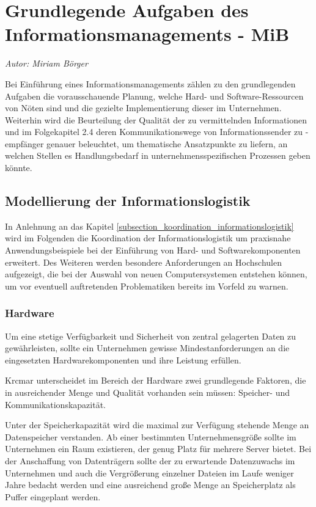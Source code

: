 \section{Grundlegende Aufgaben des Informationsmanagements - MiB}
\label{grundlegende_aufgaben_des_informationsmanagements}
\textit{Autor: Miriam Börger}

Bei Einführung eines Informationsmanagements zählen zu den grundlegenden Aufgaben die 
vorausschauende Planung, welche Hard- und Software-Ressourcen von Nöten sind und die 
gezielte Implementierung dieser im Unternehmen. Weiterhin wird die Beurteilung der Qualität 
der zu vermittelnden Informationen und im Folgekapitel 2.4 deren Kommunikationswege von 
Informationssender zu -empfänger genauer beleuchtet, um thematische Ansatzpunkte zu 
liefern, an welchen Stellen es Handlungsbedarf in unternehmensspezifischen Prozessen 
geben könnte. 

\subsection{Modellierung der Informationslogistik}
In Anlehnung an das Kapitel \ref{subsection_koordination_informationslogistik} wird im Folgenden die Koordination der 
Informationslogistik um praxisnahe Anwendungsbeispiele bei der Einführung von Hard- und 
Softwarekomponenten erweitert. Des Weiteren werden besondere Anforderungen an 
Hochschulen aufgezeigt, die bei der Auswahl von neuen Computersystemen entstehen können, 
um vor eventuell auftretenden Problematiken bereits im Vorfeld zu warnen.

\subsubsection{Hardware}
Um eine stetige Verfügbarkeit und Sicherheit von zentral gelagerten Daten zu gewährleisten, 
sollte ein Unternehmen gewisse Mindestanforderungen an die eingesetzten Hardwarekomponenten 
und ihre Leistung erfüllen. 

Krcmar unterscheidet im Bereich der Hardware zwei grundlegende Faktoren, die in ausreichender 
Menge und Qualität vorhanden sein müssen: Speicher- und Kommunikationskapazität. 

Unter der Speicherkapazität wird die maximal zur Verfügung stehende Menge an Datenspeicher verstanden. 
Ab einer bestimmten Unternehmensgröße sollte im Unternehmen ein Raum existieren, der genug Platz 
für mehrere Server bietet. Bei der Anschaffung von Datenträgern sollte der zu erwartende 
Datenzuwachs im Unternehmen und auch die Vergrößerung einzelner Dateien im Laufe weniger Jahre 
bedacht werden und eine ausreichend große Menge an Speicherplatz als Puffer eingeplant werden. 

